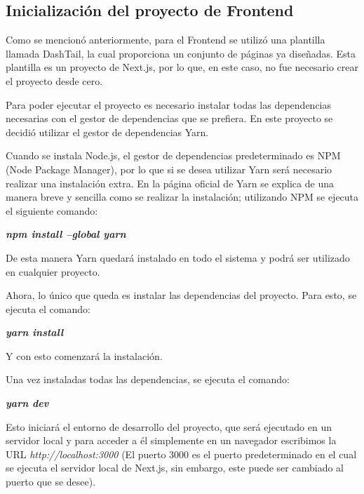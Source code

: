\subsection{Inicialización del proyecto de Frontend}
Como se mencionó anteriormente, para el Frontend se utilizó una plantilla llamada DashTail, la cual proporciona un conjunto de páginas ya diseñadas. Esta plantilla es un proyecto de Next.js, por lo que, en este caso, no fue necesario crear el proyecto desde cero.

Para poder ejecutar el proyecto es necesario instalar todas las dependencias necesarias con el gestor de dependencias que se prefiera. En este proyecto se decidió utilizar el gestor de dependencias Yarn.

Cuando se instala Node.js, el gestor de dependencias predeterminado es NPM (Node Package Manager), por lo que si se desea utilizar Yarn será necesario realizar una instalación extra. En la página oficial de Yarn se explica de una manera breve y sencilla como se realizar la instalación; utilizando NPM se ejecuta el siguiente comando:
    \begin{center}
        \textbf{
            \emph{
                npm install --global yarn
                }
            }
    \end{center}
De esta manera Yarn quedará instalado en todo el sistema y podrá ser utilizado en cualquier proyecto.

Ahora, lo único que queda es instalar las dependencias del proyecto. Para esto, se ejecuta el comando: 
    \begin{center}
        \textbf{
            \emph{
                yarn install
                }
            }
    \end{center}
Y con esto comenzará la instalación.

Una vez instaladas todas las dependencias, se ejecuta el comando:
    \begin{center}
        \textbf{
            \emph{
                yarn dev
                }
            }
    \end{center}
Esto iniciará el entorno de desarrollo del proyecto, que será ejecutado en un servidor local y para acceder a él simplemente en un navegador escribimos la URL \emph{http://localhost:3000} (El puerto 3000 es el puerto predeterminado en el cual se ejecuta el servidor local de Next.js, sin embargo, este puede ser cambiado al puerto que se desee).